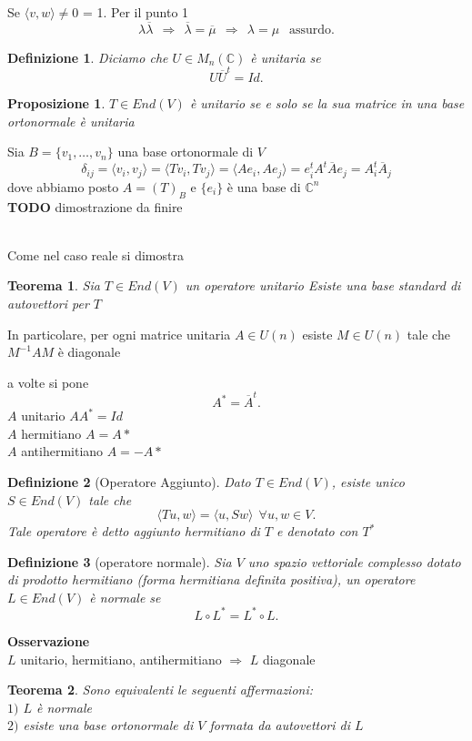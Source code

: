 \documentclass[12px]{article}
\theoremstyle{break}
\newtheorem{theo}{Teorema}
\theoremstyle{break}
\theoremstyle{break}
\newtheorem{defin}{Definizione}
\theoremstyle{break}
\newtheorem{propo}{Proposizione}
\theoremstyle{break}
\newtheorem*{dimo}{Dimostrazione}
\theoremstyle{break}
\newenvironment{dimo}
  {\begin{dimostrazione}}
  {\hfill\square\end{dimostrazione}}
\newenvironment{teo}
{\begin{mdframed}[linecolor=red, backgroundcolor=red!10]\begin{theo}}
  {\end{theo}\end{mdframed}}
\newenvironment{prop}
{\begin{mdframed}[linecolor=red, backgroundcolor=red!10]\begin{propo}}
  {\end{propo}\end{mdframed}}
\newenvironment{defi}
{\begin{mdframed}[linecolor=orange, backgroundcolor=orange!10]\begin{defin}}
  {\end{defin}\end{mdframed}}
\newcommand{\C}{\mathbb{C}}
\begin{document}
Se $ \langle v, w \rangle \neq 0 $  \Rightarrow \lambda \overline{\mu} = 1. Per il punto 1\\
\[
	\lambda\overline{\lambda} \ \ \Rightarrow \ \ \overline{\lambda} = \overline{\mu} \ \ \Rightarrow \ \ \lambda = \mu \ \ \text{ assurdo}
.\] 
\begin{defi}
	Diciamo che $U\in M_n(\C)$ è unitaria se 
	\[
		U\overline{U}^t = Id
	.\] 
\end{defi}
\begin{prop}
	$T\in End(V)$ è unitario se e solo se la sua matrice in una base ortonormale è unitaria
\end{prop}
\begin{dimo}
	Sia $B = \{v_1,\ldots,v_n\}$ una base ortonormale di $V$ 
	\[
		\delta_{ij} = \langle v_i, v_j \rangle  = \langle Tv_i, Tv_j \rangle  = \langle Ae_i, Ae_j \rangle = e_i^tA^t\overline{A}e_j = A_i^t\overline{A}_j
	\] 
	dove abbiamo posto $A = (T)_B$ e $\{e_i\}$ è una base di $\C^n$
	\\\textbf{TODO} dimostrazione da finire

\end{dimo}\\
Come nel caso reale si dimostra
\begin{teo}
	Sia $T\in End(V)$ un operatore unitario Esiste una base standard di autovettori per $T$
\end{teo} 
In particolare, per ogni matrice unitaria $A\in U(n)$ esiste $M\in U(n)$ tale che $M^{-1}AM$ è diagonale
\begin{nota}
	a volte si pone 
	\[
	 A^* = \overline{A}^t
	.\] 
	$A$ unitario $AA^* = Id$ \\
	$A$ hermitiano $A = A*$ \\
	$A$ antihermitiano $A=-A*$
\end{nota}
\begin{defi}[Operatore Aggiunto]
	Dato $T\in End(V)$, esiste unico $S\in End(V)$ tale che 
	\[
	\langle Tu, w \rangle = \langle u, Sw \rangle \ \ \forall u,w\in V
	.\] 
	Tale operatore è detto aggiunto hermitiano di $T$ e denotato con $T^*$
\end{defi}
\begin{defi}[operatore normale]
	Sia $V$ uno spazio vettoriale complesso dotato di prodotto hermitiano (forma hermitiana definita positiva), un operatore $L\in End(V)$ è normale se 
	\[
	L\circ L^* = L^*\circ L
	.\] 
\end{defi}
\textbf{Osservazione}\\
$L$ unitario, hermitiano, antihermitiano $ \Rightarrow$ $L$ diagonale
\begin{teo}
	Sono equivalenti le seguenti affermazioni:\\
	$1)$ $L$ è normale\\
	$2)$ esiste una base ortonormale di $V$ formata da autovettori di $L$
\end{teo}
\end{document}
